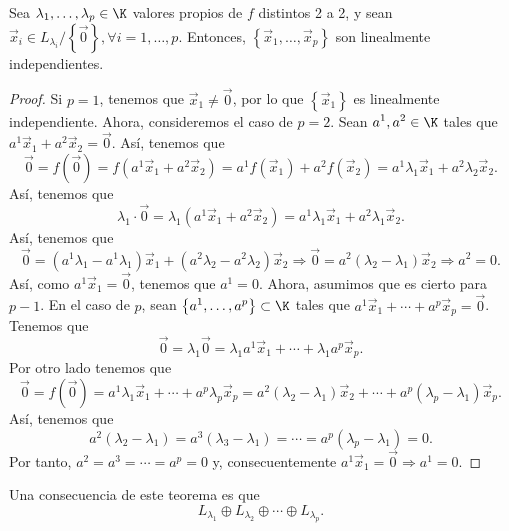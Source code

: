 \begin{ftheorem}[]
	\normalfont Sea $\displaystyle \lambda_{1}, \ldots, \lambda_{p} \in \K $ valores propios de $\displaystyle f $ distintos 2 a 2, y sean $\displaystyle \vec{x}_{i} \in L_{\lambda_{i}} / \left\{ \vec{0}\right\}, \forall i = 1, \ldots, p $. Entonces, $\displaystyle \left\{ \vec{x}_{1}, \ldots, \vec{x}_{p}\right\}  $ son linealmente independientes.
\end{ftheorem}
\begin{proof}
	Si $\displaystyle p = 1 $, tenemos que $\displaystyle \vec{x}_{1} \neq \vec{0} $, por lo que $\displaystyle \left\{ \vec{x}_{1}\right\}  $ es linealmente independiente. Ahora, consideremos el caso de $\displaystyle p = 2 $. Sean $\displaystyle a^{1}, a^{2} \in \K $ tales que $\displaystyle a^{1}\vec{x}_{1} + a^{2}\vec{x}_{2} = \vec{0} $. Así, tenemos que
	\[\vec{0} = f\left(\vec{0}\right) = f\left(a^{1}\vec{x}_{1} + a^{2}\vec{x}_{2}\right) = a^{1}f\left(\vec{x}_{1}\right) + a^{2}f\left(\vec{x}_{2}\right) = a^{1}\lambda_{1}\vec{x}_{1} + a^{2}\lambda_{2}\vec{x}_{2} .\]
Así, tenemos que
\[\lambda_{1} \cdot \vec{0} = \lambda_{1}\left(a^{1}\vec{x}_{1} + a^{2}\vec{x}_{2}\right) = a^{1}\lambda_{1}\vec{x}_{1} + a^{2}\lambda_{1}\vec{x}_{2} .\]
Así, tenemos que
\[ \vec{0} = \left(a^{1}\lambda_{1} - a^{1}\lambda_{1}\right) \vec{x}_{1} + \left(a^{2}\lambda_{2}-a^{2}\lambda_{2}\right)\vec{x}_{2} \Rightarrow \vec{0} = a^{2}\left(\lambda_{2}-\lambda_{1}\right)\vec{x}_{2} \Rightarrow a^{2} = 0 .\]
Así, como $\displaystyle a^{1}\vec{x}_{1} = \vec{0} $, tenemos que $\displaystyle a^{1} = 0 $. Ahora, asumimos que es cierto para $\displaystyle p - 1 $. En el caso de $\displaystyle p $, sean $\displaystyle \left\{ a^{1}, \ldots, a^{p}\right\} \subset \K $ tales que $\displaystyle a^{1}\vec{x}_{1} + \cdots + a^{p}\vec{x}_{p} = \vec{0} $. Tenemos que
\[\vec{0} = \lambda_{1} \vec{0} = \lambda_{1}a^{1}\vec{x}_{1} + \cdots + \lambda_{1}a^{p}\vec{x}_{p} .\]
Por otro lado tenemos que
\[\vec{0} = f\left(\vec{0}\right) = a^{1}\lambda_{1}\vec{x}_{1} + \cdots + a^{p}\lambda_{p}\vec{x}_{p} = a^{2}\left(\lambda_{2}-\lambda_{1}\right)\vec{x}_{2} + \cdots + a^{p}\left(\lambda_{p}-\lambda_{1}\right)\vec{x}_{p} .\]
Así, tenemos que 
\[ a^{2}\left(\lambda_{2}-\lambda_{1}\right) = a^{3}\left(\lambda_{3}-\lambda_{1}\right) = \cdots = a^{p}\left(\lambda_{p}-\lambda_{1}\right) = 0 .\]
Por tanto, $\displaystyle a^{2} = a^{3} = \cdots = a^{p} = 0 $ y, consecuentemente $\displaystyle a^{1}\vec{x}_{1} = \vec{0} \Rightarrow a^{1} = 0 $.
\end{proof}
\begin{observation}
\normalfont Una consecuencia de este teorema es que 
\[L_{\lambda_{1}}\oplus L_{\lambda_{2}} \oplus \cdots \oplus L_{\lambda_{p}} .\]
\end{observation}

